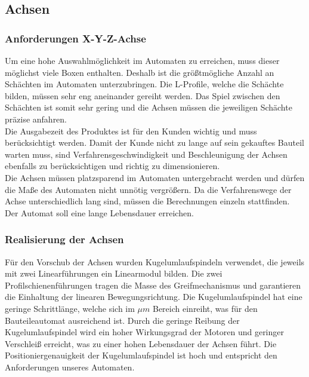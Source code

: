  


 

\subsection{Achsen}

\subsubsection{Anforderungen X-Y-Z-Achse}

Um eine hohe Auswahlmöglichkeit im Automaten zu erreichen, muss dieser möglichst viele Boxen enthalten. Deshalb ist die größtmögliche Anzahl an Schächten im Automaten unterzubringen. Die L-Profile, welche die Schächte bilden, müssen sehr eng aneinander gereiht werden. Das Spiel zwischen den Schächten ist somit sehr gering und die Achsen müssen die jeweiligen Schächte präzise anfahren. \\
Die Ausgabezeit des Produktes ist für den Kunden wichtig und muss berücksichtigt werden. Damit der Kunde nicht zu lange auf sein gekauftes Bauteil warten muss, sind Verfahrensgeschwindigkeit und Beschleunigung der Achsen ebenfalls zu berücksichtigen und richtig zu dimensionieren. \\
Die Achsen müssen platzsparend im Automaten untergebracht werden und dürfen die Maße des Automaten nicht unnötig
vergrößern. Da die Verfahrenswege der Achse unterschiedlich lang sind, müssen die Berechnungen einzeln stattfinden. 
Der Automat soll eine lange Lebensdauer erreichen.\\



\subsubsection{Realisierung der Achsen}




Für den Vorschub der Achsen wurden Kugelumlaufspindeln verwendet, die jeweils mit zwei Linearführungen ein 
Linearmodul bilden. Die zwei Profilschienenführungen tragen die Masse des Greifmechanismus und garantieren die Einhaltung der linearen Bewegungsrichtung. Die Kugelumlaufspindel hat eine geringe Schrittlänge, welche sich im $\mu m$ Bereich einreiht, was für den Bauteileautomat ausreichend ist. Durch die geringe Reibung der Kugelumlaufspindel wird ein hoher Wirkungsgrad der Motoren und geringer Verschleiß erreicht, was zu einer hohen Lebensdauer der Achsen führt. Die Positioniergenauigkeit der Kugelumlaufspindel ist hoch und entspricht den Anforderungen unseres Automaten.\\


